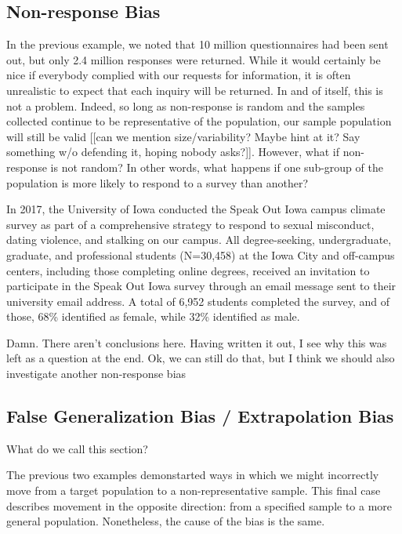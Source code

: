 \documentclass[
]{book}
\theoremstyle{definition}
\theoremstyle{definition}
\theoremstyle{definition}
\theoremstyle{remark}
\begin{document}
\hypertarget{non-response-bias}{%
\subsection{Non-response Bias}\label{non-response-bias}}

In the previous example, we noted that 10 million questionnaires had been sent out, but only 2.4 million responses were returned. While it would certainly be nice if everybody complied with our requests for information, it is often unrealistic to expect that each inquiry will be returned. In and of itself, this is not a problem. Indeed, so long as non-response is random and the samples collected continue to be representative of the population, our sample population will still be valid {[}{[}can we mention size/variability? Maybe hint at it? Say something w/o defending it, hoping nobody asks?{]}{]}. However, what if non-response is not random? In other words, what happens if one sub-group of the population is more likely to respond to a survey than another?

In 2017, the University of Iowa conducted the Speak Out Iowa campus climate survey as part of a comprehensive strategy to respond to sexual misconduct, dating violence, and stalking on our campus. All degree-seeking, undergraduate, graduate, and professional students (N=30,458) at the Iowa City and off-campus centers, including those completing online degrees, received an invitation to participate in the Speak Out Iowa survey through an email message sent to their university email address. A total of 6,952 students completed the survey, and of those, 68\% identified as female, while 32\% identified as male.

Damn. There aren't conclusions here. Having written it out, I see why this was left as a question at the end. Ok, we can still do that, but I think we should also investigate another non-response bias

\hypertarget{false-generalization-bias-extrapolation-bias}{%
\subsection{False Generalization Bias / Extrapolation Bias}\label{false-generalization-bias-extrapolation-bias}}

What do we call this section?

The previous two examples demonstarted ways in which we might incorrectly move from a target population to a non-representative sample. This final case describes movement in the opposite direction: from a specified sample to a more general population. Nonetheless, the cause of the bias is the same.
\end{document}
